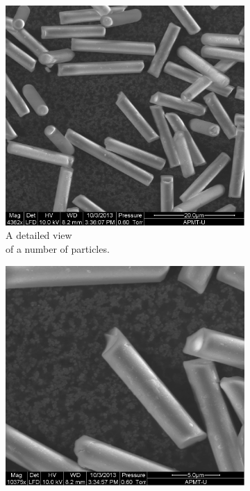 \begin{figure}[H]
\centering
\begin{subfigure}[3a]{0.40\textwidth}
\includegraphics[width=\textwidth]{figures/method/semizoomed.png}
\caption{A detailed view \\ of a number of particles.}
\end{subfigure}\hspace{1em}%
\begin{subfigure}[3b]{0.40\textwidth}
\includegraphics[width=\textwidth]{figures/method/zoomedbroken.png}

\end{subfigure}
\end{figure}
